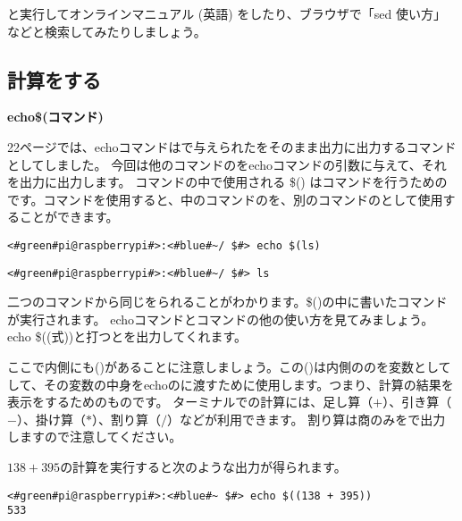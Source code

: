と実行してオンラインマニュアル (英語) をしたり、ブラウザで「sed 使い方」などと検索してみたりしましょう。

\subsection{計算をする}

\noindent
{\bf echo\textvisiblespace\$(コマンド) }

22ページでは、echoコマンドはで与えられたをそのまま出力に出力するコマンドとしてしました。
今回は他のコマンドのをechoコマンドの引数に与えて、それを出力に出力します。
コマンドの中で使用される \$() はコマンドを行うためのです。コマンドを使用すると、中のコマンドのを、別のコマンドのとして使用することができます。
\begin{lstlisting}[caption=echo コマンド置換を使った例1, label=cmdsbs:echo]
<#green#pi@raspberrypi#>:<#blue#~/ $#> echo $(ls)
\end{lstlisting} 

\begin{lstlisting}[caption=lsコマンドの出力, label=cmdsbs:ls]
<#green#pi@raspberrypi#>:<#blue#~/ $#> ls
\end{lstlisting}

二つのコマンドから同じをられることがわかります。\$()の中に書いたコマンドが実行されます。
echoコマンドとコマンドの他の使い方を見てみましょう。echo \$((式))と打つとを出力してくれます。

ここで内側にも()があることに注意しましょう。この()は内側ののを変数としてして、その変数の中身をechoのに渡すために使用します。つまり、計算の結果を表示をするためのものです。
ターミナルでの計算には、足し算（$+$）、引き算（$-$）、掛け算（$*$）、割り算（$/$）などが利用できます。 割り算は商のみをで出力しますので注意してください。

$138+395$の計算を実行すると次のような出力が得られます。
\begin{lstlisting}[caption=echo コマンドを使った例2, label=cmdsbs:calc]
<#green#pi@raspberrypi#>:<#blue#~ $#> echo $((138 + 395))
533
\end{lstlisting}

